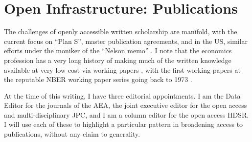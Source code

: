 \documentclass{article}
\begin{document}
\section{Open Infrastructure: Publications}
\label{sec:publications}

The challenges of openly accessible written scholarship are manifold, with the current focus on ``Plan S'', master publication agreements, and in the US, similar efforts under the moniker of the ``Nelson memo'' \parencite{brainard_white_2022,brainard_us_2024}. I note that the economics profession has a very long history of making much of the written knowledge available at very low cost via working papers \parencite{vilhuber_reproducibility_2020}, with the first working papers at the reputable NBER working paper series going back to 1973 \parencite{welch_education_1973}.

At the time of this writing, I have three editorial appointments. I am the Data Editor for the journals of the \acf{AEA}, the joint executive editor for the open access and multi-disciplinary \ac{JPC}, and I am a column editor for the open access \ac{HDSR}. I will use each of these to highlight a particular pattern in broadening access to publications, without any claim to generality. 
\end{document}
